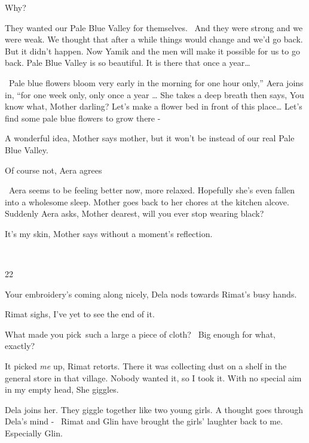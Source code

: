 \documentclass[letterpaper]{article}
\begin{document}
{\textquotedbl}Why?{\textquotedbl} 

{\textquotedbl}They wanted our Pale Blue Valley for themselves. ~And they were strong and we were weak. We thought that
after a while things would change and we'd go back. But it didn't happen. Now Yamik and the men will make it possible
for us to go back. Pale Blue Valley is so beautiful. It is there that once a year{\dots} {\textquotedbl} 

\ {\textquotedbl}Pale blue flowers bloom very early in the morning for one hour only,'' Aera joins in, ``for one week
only, only once a year {\dots}{\textquotedbl} She takes a deep breath then says, {\textquotedbl}You know what, Mother
darling? Let's make a flower bed in front of this place{\dots} Let's find some pale blue flowers to grow there
-{\textquotedbl}

{\textquotedbl}A wonderful idea,{\textquotedbl} Mother says mother,{\textquotedbl} but it won't be instead of our real
Pale Blue Valley.{\textquotedbl}

{\textquotedbl}Of course not,{\textquotedbl} Aera agrees

\ Aera seems to be feeling better now, more relaxed. Hopefully she's even fallen into a wholesome sleep. Mother goes
back to her chores at the kitchen alcove. Suddenly Aera asks, {\textquotedbl}Mother dearest, will you ever stop wearing
black?{\textquotedbl} 

{\textquotedbl}It's my{ }skin,{\textquotedbl} Mother says without a moment's reflection. 

~

22~~

{\textquotedbl}Your embroidery's coming along nicely,{\textquotedbl} Dela nods towards Rimat's busy hands. 

Rimat sighs, {\textquotedbl}I've yet to see the end of it.{\textquotedbl} 

{\textquotedbl}What made you pick~such a large a piece of cloth? \ Big enough for what, exactly?{\textquotedbl}

{\textquotedbl}It picked \textit{me} up,{\textquotedbl} Rimat retorts. {\textquotedbl}There it was collecting dust on a
shelf in the general store in that village. Nobody wanted it, so I took it. With no special aim in my empty
head,{\textquotedbl} She giggles.

Dela joins her. They giggle together like two young girls. A thought goes through Dela's mind - \ Rimat and Glin have
brought the girls' laughter back to me. Especially Glin. 
\end{document}
